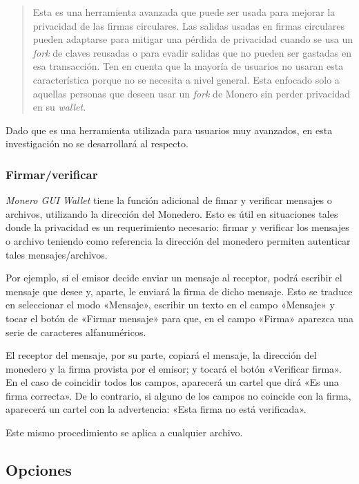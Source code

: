 \documentclass[12pt,a4paper,twoside]{book}
\begin{document}
\begin{quotation}
Esta es una herramienta avanzada que puede ser usada para mejorar la privacidad de las firmas circulares. Las salidas usadas en firmas circulares pueden adaptarse para mitigar una pérdida de privacidad cuando se usa un \textit{fork} de claves reusadas o para evadir salidas que no pueden ser gastadas en esa transacción. Ten en cuenta que la mayoría de usuarios no usaran esta característica porque no se necesita a nivel general. Esta enfocado solo a aquellas personas que deseen usar un \textit{fork} de Monero sin perder privacidad en su \textit{wallet}. \cite[\# 10-3]{satoshilov}
\end{quotation}

Dado que es una herramienta utilizada para usuarios muy avanzados, en esta investigación no se desarrollará al respecto.

\subsubsection{Firmar/verificar}
\textit{Monero GUI Wallet} tiene la función adicional de fimar y verificar mensajes o archivos, utilizando la dirección del Monedero. Esto es útil en situaciones tales donde la privacidad es un requerimiento necesario: firmar y verificar los mensajes o archivo teniendo como referencia la dirección del monedero permiten autenticar tales mensajes/archivos.

Por ejemplo, si el emisor decide enviar un mensaje al receptor, podrá escribir el mensaje que desee y, aparte, le enviará la firma de dicho mensaje. Esto se traduce en seleccionar el modo «Mensaje», escribir un texto en el campo «Mensaje» y tocar el botón de «Firmar mensaje» para que, en el campo «Firma» aparezca una serie de caracteres alfanuméricos.

El receptor del mensaje, por su parte, copiará el mensaje, la dirección del monedero y la firma provista por el emisor; y tocará el botón «Verificar firma». En el caso de coincidir todos los campos, aparecerá un cartel que dirá «Es una firma correcta». De lo contrario, si alguno de los campos no coincide con la firma, aparecerá un cartel con la advertencia: «Esta firma no está verificada».

Este mismo procedimiento se aplica a cualquier archivo.

\subsection{Opciones}
\end{document}
